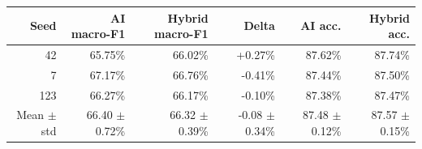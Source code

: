 ﻿\scriptsize
\setlength{\tabcolsep}{2pt}
\begin{tabular}{rrrrrr}
\toprule
Seed & AI macro-F1 & Hybrid macro-F1 & Delta & AI acc. & Hybrid acc. \\
\midrule
42 & 65.75\% & 66.02\% & +0.27\% & 87.62\% & 87.74\% \\
7 & 67.17\% & 66.76\% & -0.41\% & 87.44\% & 87.50\% \\
123 & 66.27\% & 66.17\% & -0.10\% & 87.38\% & 87.47\% \\
Mean $\pm$ std & 66.40 $\pm$ 0.72\% & 66.32 $\pm$ 0.39\% & -0.08 $\pm$ 0.34\% & 87.48 $\pm$ 0.12\% & 87.57 $\pm$ 0.15\% \\
\bottomrule
\end{tabular}
